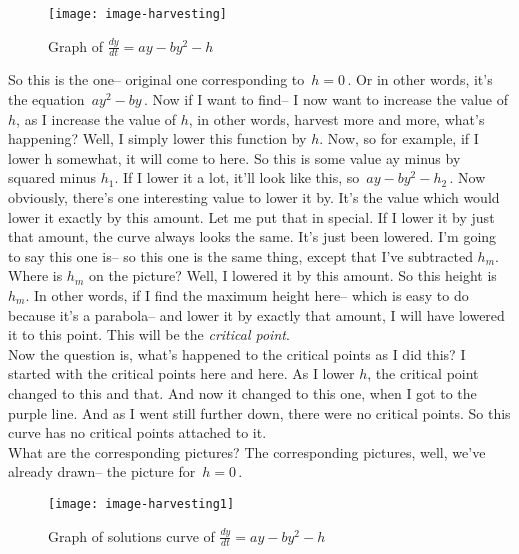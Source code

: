 \begin{wrapfigure}{r}{5.5cm}
  \texttt{[image: image-harvesting]}
  \caption{Graph of $\frac{dy}{dt} = ay - by^2 - h$}
\end{wrapfigure}

So this is the one-- original one corresponding to $\,h = 0 \,$.
Or in other words, it's the equation $\, ay^2 - by \,$.
Now if I want to find--
I now want to increase the value of $h$, as I increase the value of $h$,
in other words, harvest more and more, what's happening?
Well, I simply lower this function by $h$.
Now, so for example, if I lower h somewhat, it will come to here.
So this is some value ay minus by squared minus $h_1$. 
If I lower it a lot, it'll look like this, so $\, ay - by^2 - h_{2}\,$.
Now obviously, there's one interesting value to lower it by.
It's the value which would lower it exactly by this amount.
Let me put that in special.
If I lower it by just that amount, the curve always looks the same.
It's just been lowered. I'm going to say this one is--
so this one is the same thing, except that I've subtracted $h_m$.
Where is $h_m$ on the picture?
Well, I lowered it by this amount. So this height is $h_m$.
In other words, if I find the maximum height here--
which is easy to do because it's a parabola-- and lower it by exactly that amount,
I will have lowered it to this point. 
This will be the \emph{critical point}. \\
Now the question is, what's happened to the critical points
as I did this?
I started with the critical points here and here.
As I lower $h$, the critical point changed to this and that.
And now it changed to this one, when I got to the purple line.
And as I went still further down, there were no critical points.
So this curve has no critical points attached to it.\\

What are the corresponding pictures?
The corresponding pictures, well, we've already drawn--
the picture for $\, h = 0 \,$.

\begin{wrapfigure}{r}{5.5cm}
  \texttt{[image: image-harvesting1]}
  \caption{Graph of solutions curve of $\frac{dy}{dt} = ay - by^2 - h$}
\end{wrapfigure}

